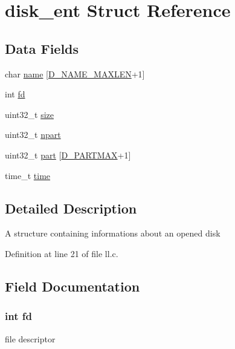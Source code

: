 \hypertarget{structdisk__ent}{}\section{disk\+\_\+ent Struct Reference}
\label{structdisk__ent}
\subsection*{Data Fields}
\begin{DoxyCompactItemize}
\item 
char \hyperlink{structdisk__ent_abdbe698c98e706aedc0bb0440029eae3}{name} \mbox{[}\hyperlink{tfs__format_8c_ab30348e352fc02b3ad044bfe2577ef18}{D\+\_\+\+N\+A\+M\+E\+\_\+\+M\+A\+X\+L\+E\+N}+1\mbox{]}
\item 
int \hyperlink{structdisk__ent_a6f8059414f0228f0256115e024eeed4b}{fd}
\item 
uint32\+\_\+t \hyperlink{structdisk__ent_ab2c6b258f02add8fdf4cfc7c371dd772}{size}
\item 
uint32\+\_\+t \hyperlink{structdisk__ent_ac84778576a3eb0108d6839c8f24f373c}{npart}
\item 
uint32\+\_\+t \hyperlink{structdisk__ent_ae2e0abcdae058274a0cea31ad73c85a8}{part} \mbox{[}\hyperlink{ll_8h_a318f8a09c916fffa98b557818d12ec0a}{D\+\_\+\+P\+A\+R\+T\+M\+A\+X}+1\mbox{]}
\item 
time\+\_\+t \hyperlink{structdisk__ent_ab842bdb7d02be824fb48613032b4ff36}{time}
\end{DoxyCompactItemize}


\subsection{Detailed Description}
A structure containing informations about an opened disk 

Definition at line 21 of file ll.\+c.



\subsection{Field Documentation}
\hypertarget{structdisk__ent_a6f8059414f0228f0256115e024eeed4b}{}
\subsubsection[{fd}]{\setlength{\rightskip}{0pt plus 5cm}int fd}\label{structdisk__ent_a6f8059414f0228f0256115e024eeed4b}
file descriptor 

